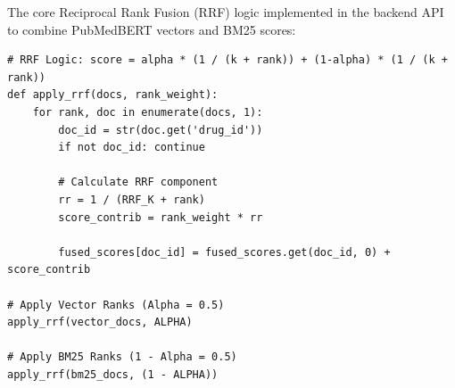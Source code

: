 The core Reciprocal Rank Fusion (RRF) logic implemented in the backend API to combine PubMedBERT vectors and BM25 scores:

\begin{verbatim}
# RRF Logic: score = alpha * (1 / (k + rank)) + (1-alpha) * (1 / (k + rank))
def apply_rrf(docs, rank_weight):
    for rank, doc in enumerate(docs, 1):
        doc_id = str(doc.get('drug_id'))
        if not doc_id: continue
        
        # Calculate RRF component
        rr = 1 / (RRF_K + rank)
        score_contrib = rank_weight * rr
        
        fused_scores[doc_id] = fused_scores.get(doc_id, 0) + score_contrib

# Apply Vector Ranks (Alpha = 0.5)
apply_rrf(vector_docs, ALPHA)

# Apply BM25 Ranks (1 - Alpha = 0.5)
apply_rrf(bm25_docs, (1 - ALPHA))
\end{verbatim}
